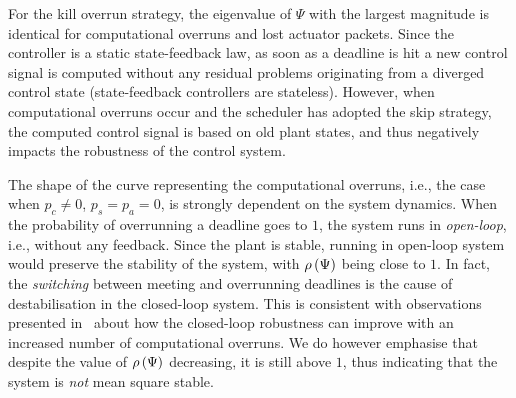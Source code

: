 For the kill overrun strategy, the eigenvalue of $\Psi$ with the largest magnitude is identical for computational overruns and lost actuator packets.
Since the controller is a static state-feedback law, as soon as a deadline is hit a new control signal is computed without any residual problems originating from a diverged control state (state-feedback controllers are stateless).
However, when computational overruns occur and the scheduler has adopted the skip strategy, the computed control signal is based on old plant states, and thus negatively impacts the robustness of the control system.

The shape of the curve representing the computational overruns, i.e., the case when $p_c \neq 0$, $p_s = p_a = 0$, is strongly dependent on the system dynamics.
When the probability of overrunning a deadline goes to $1$, the system runs in \emph{open-loop}, i.e., without any feedback.
Since the plant is stable, running in open-loop system would preserve the stability of the system, with $\rho\left( \Psi \right)$ being close to $1$.
In fact, the \emph{switching} between meeting and overrunning deadlines is the cause of destabilisation in the closed-loop system.
This is consistent with observations presented in~\cite{Vreman:2021} about how the closed-loop robustness can improve with an increased number of computational overruns.
We do however emphasise that despite the value of $\rho\left( \Psi \right)$ decreasing, it is still above $1$, thus indicating that the system is \emph{not} mean square stable.

